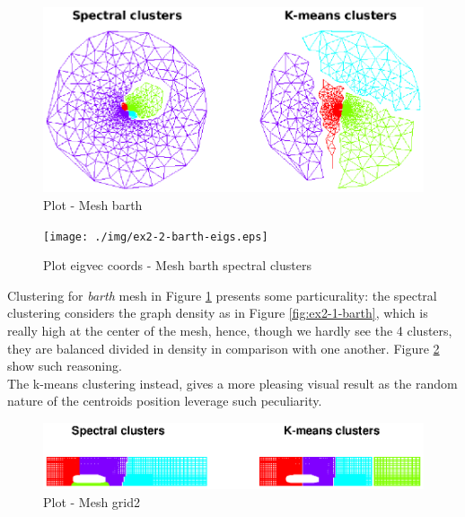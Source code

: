 \documentclass[unicode,11pt,a4paper,oneside,numbers=endperiod,openany]{scrartcl}
\begin{document}
\begin{figure}[H]
    \centering
    \caption{Plot - Mesh barth}
    \label{fig:ex2-2-barth}
    \includegraphics[width=\textwidth, trim={0cm 4.5cm 0cm 0cm}, clip]{./img/ex2-2-barth.eps}
\end{figure}

\begin{figure}[H]
    \centering
    \caption{Plot eigvec coords - Mesh barth spectral clusters}
    \label{fig:ex2-2-barth-eigs}
    \texttt{[image: ./img/ex2-2-barth-eigs.eps]}
\end{figure}

Clustering for \textit{barth} mesh in Figure \ref{fig:ex2-2-barth} presents some particurality:
the spectral clustering considers the graph density as in Figure \ref{fig:ex2-1-barth},
which is really high at the center of the mesh,
hence, though we hardly see the 4 clusters,
they are balanced divided in density in comparison with one another.
Figure \ref{fig:ex2-2-barth-eigs} show such reasoning.\\
The k-means clustering instead, gives a more pleasing visual result as the random nature of the
centroids position leverage such peculiarity.

\begin{figure}[H]
    \centering
    \caption{Plot - Mesh grid2}
    \label{fig:ex2-2-grid2}
    \includegraphics[width=\textwidth, trim={0cm 8cm 0cm 0cm}, clip]{./img/ex2-2-grid2.eps}
\end{figure}
\end{document}
